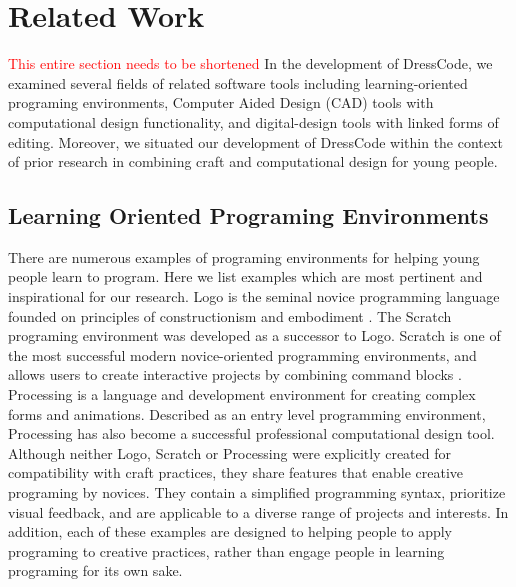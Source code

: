 \documentclass{sigchi}
\begin{document}
\section{Related Work}
\textcolor{red}{This entire section needs to be shortened}
In the development of DressCode, we examined several fields of related software tools including learning-oriented programing environments, Computer Aided Design (CAD) tools with computational design functionality, and digital-design tools with linked forms of editing. Moreover, we situated our development of DressCode within the context of prior research in combining craft and computational design for young people.

\subsection{Learning Oriented Programing Environments}
There are numerous examples of programing environments for helping young people learn to program. Here we list examples which are most pertinent and inspirational for our research. Logo is the seminal novice programming language founded on principles of constructionism and embodiment \cite{papert}. The Scratch programing environment was developed as a successor to Logo. Scratch is one of the most successful modern novice-oriented programming environments, and allows users to create interactive projects by combining command blocks \cite{resnick2}. Processing is a language and development environment for creating complex forms and animations. Described as an entry level programming environment, Processing has also become a successful professional computational design tool\cite{processing}. Although neither Logo, Scratch or Processing were explicitly created for compatibility with craft practices, they share features that enable creative programing by novices. They contain a simplified programming syntax, prioritize visual feedback, and are applicable to a diverse range of projects and interests. In addition, each of these examples are designed to helping people to apply programing to creative practices, rather than engage people in learning programing for its own sake. 
\end{document}
